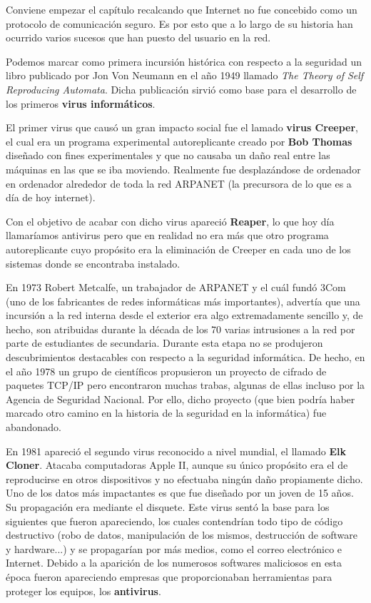   Conviene empezar el capítulo recalcando que Internet no fue
  concebido como un protocolo de comunicación seguro.  Es por esto que
  a lo largo de su historia han ocurrido varios sucesos que han puesto
   del usuario en la
  red.

Podemos marcar como primera incursión histórica con respecto a la seguridad un libro publicado por Jon Von Neumann en el año 1949 llamado \textit{The Theory of Self Reproducing Automata}. Dicha publicación sirvió como  base para el desarrollo de los primeros \textbf{virus informáticos}.

El primer virus que causó un gran impacto social fue el lamado
\textbf{virus Creeper}, el cual era un programa experimental
autoreplicante creado por \textbf{Bob Thomas} diseñado con fines
experimentales y que no causaba un daño real entre las máquinas en las
que se iba moviendo.  Realmente fue desplazándose de ordenador en
ordenador alrededor de toda la red ARPANET (la precursora de lo que es
a día de hoy internet).

Con el objetivo de acabar con dicho virus apareció \textbf{Reaper}, lo
que hoy día llamaríamos antivirus pero que en realidad no era más que
otro programa autoreplicante cuyo propósito era la eliminación de
Creeper en cada uno de los sistemas donde se encontraba instalado.

En 1973 Robert Metcalfe, un trabajador de ARPANET y el cuál fundó 3Com
(uno de los fabricantes de redes informáticas más importantes),
advertía que una incursión a la red interna desde el exterior era algo
extremadamente sencillo y, de hecho, son atribuidas durante la década
de los 70 varias intrusiones a la red por parte de estudiantes de
secundaria.  Durante esta etapa no se produjeron descubrimientos
destacables con respecto a la seguridad informática. De hecho, en el
año 1978 un grupo de científicos propusieron un proyecto de cifrado de
paquetes TCP/IP pero encontraron muchas trabas, algunas de ellas
incluso por la Agencia de Seguridad Nacional. Por ello, dicho proyecto
(que bien podría haber marcado otro camino en la historia de la
seguridad en la informática) fue abandonado.

En 1981 apareció el segundo virus reconocido a nivel mundial, el
llamado \textbf{Elk Cloner}. Atacaba computadoras Apple II, aunque su
único propósito era el de reproducirse en otros dispositivos y no
efectuaba ningún daño propiamente dicho. Uno de los datos más
impactantes es que fue diseñado por un joven de 15 años. Su
propagación era mediante el disquete.  Este virus sentó la base para
los siguientes que fueron apareciendo, los cuales contendrían todo
tipo de código destructivo (robo de datos, manipulación de los mismos,
destrucción de software y hardware...) y se propagarían por más
medios, como el correo electrónico e Internet.  Debido a la aparición
de los numerosos softwares maliciosos en esta época fueron apareciendo
empresas que proporcionaban herramientas para proteger los equipos,
los \textbf{antivirus}.

